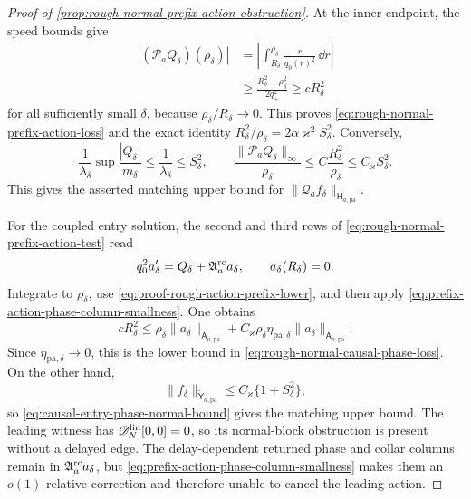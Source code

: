 \begin{proof}[Proof of
\cref{prop:rough-normal-prefix-action-obstruction}]
At the inner endpoint, the speed bounds give
\begin{align}
 |(\mathcal P_aQ_\delta)(\rho_\delta)|
 &=\left|\int_{R_\delta}^{\rho_\delta}
                 \frac{r}{q_0(r)^2}\,\dd r\right|\\
 &\ge\frac{R_\delta^2-\rho_\delta^2}{2q_+^2}
 \ge cR_\delta^2                              \label{eq:proof-rough-action-prefix-lower}
\end{align}
for all sufficiently small \(\delta\), because
\(\rho_\delta/R_\delta\to0\).  This proves
\cref{eq:rough-normal-prefix-action-loss} and the exact identity
\(R_\delta^2/\rho_\delta=2\alpha\varkappa^2S_\delta^2\).
Conversely,
\begin{equation*}
 \frac1{\lambda_\delta}\sup\frac{|Q_\delta|}{m_\delta}
 \le\frac1{\lambda_\delta}\le S_\delta^2,\qquad
 \frac{\|\mathcal P_aQ_\delta\|_\infty}{\rho_\delta}
 \le C\frac{R_\delta^2}{\rho_\delta}
 \le C_\varkappa S_\delta^2.
\end{equation*}
This gives the asserted matching upper bound for
\(\|\mathscr Q_af_\delta\|_{\mathsf H_{a,\mathrm{pa}}}\).

For the coupled entry solution, the second and third rows of
\cref{eq:rough-normal-prefix-action-test} read
\begin{equation*}
 q_0^2a_\delta'=Q_\delta+
             \mathfrak A_a^{\rm rc}a_\delta,\qquad
 a_\delta(R_\delta)=0.
\end{equation*}
Integrate to \(\rho_\delta\), use
\cref{eq:proof-rough-action-prefix-lower}, and then apply
\cref{eq:prefix-action-phase-column-smallness}.  One obtains
\begin{equation*}
 cR_\delta^2
 \le \rho_\delta\|a_\delta\|_{\mathsf A_{a,\mathrm{pa}}}
    +C_\varkappa\rho_\delta\eta_{\mathrm{pa},\delta}
       \|a_\delta\|_{\mathsf A_{a,\mathrm{pa}}}.
\end{equation*}
Since \(\eta_{\mathrm{pa},\delta}\to0\), this is the lower bound in
\cref{eq:rough-normal-causal-phase-loss}.  On the other hand,
\[
 \|f_\delta\|_{\widetilde{\mathsf Y}_{a,\mathrm{pa}}}
 \le C_\varkappa\{1+S_\delta^2\},
\]
so \cref{eq:causal-entry-phase-normal-bound} gives the matching upper
bound.  The leading witness has
\(\mathscr D_N^{\rm lin}[0,0]=0\), so its normal-block obstruction is
present without a delayed edge.  The delay-dependent returned phase and
collar columns remain in \(\mathfrak A_a^{\rm rc}a_\delta\), but
\cref{eq:prefix-action-phase-column-smallness} makes them an \(o(1)\)
relative correction and therefore unable to cancel the leading action.
\end{proof}

